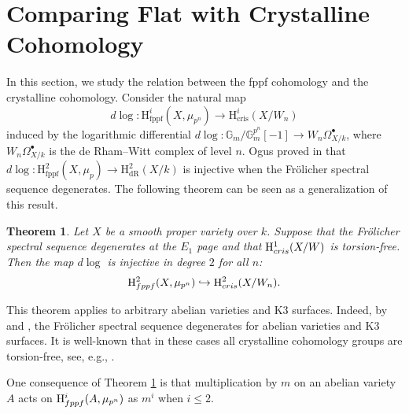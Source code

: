 \documentclass[a4paper,12pt,twoside]{report}
\newtheorem{theorem}{Theorem}[section]
\newtheorem{proposition}[theorem]{Proposition}
\newcommand{\G}{\mathbb{G}}
\newcommand{\cris}{\mathrm{cris}}
\newcommand{\fppf}{\mathrm{fppf}}
\newcommand{\dR}{\mathrm{dR}}
\newcommand{\HH}{\mathrm{H}}
\begin{document}
\medskip


\section{Comparing Flat with Crystalline Cohomology} \label{5}
In this section, we study the relation between the fppf cohomology and the crystalline cohomology. 
Consider the natural map 
\begin{equation}\label{dlog}
    d\log\colon \HH^i_{\fppf}(X,\mu_{p^n})\rightarrow \HH^i_{\cris}(X/W_n)
\end{equation}
induced by the logarithmic differential $d\log:\G_m/\G_m^{p^n}[-1]\rightarrow W_n\Omega_{X/k}^{\bullet}$, 
where $W_n\Omega_{X/k}^{\bullet}$ is the de Rham--Witt complex of level $n$. 
Ogus proved in \cite{Og} that $d\log\colon\HH^2_{\fppf}(X,\mu_p)\to \HH^2_{\dR}(X/k)$ is injective
when the Fr\"olicher spectral sequence degenerates. 
The following theorem can be seen as a generalization of this result.

\begin{theorem} \label{Inj}
    Let $X$ be a smooth proper variety over $k$.
    Suppose that the Fr\"olicher spectral sequence 
    degenerates at the $E_1$ page and that $\HH^1_{\rm{cris}}(X/W)$ is torsion-free. 
    Then the map $d\log$ is injective in degree $2$ for all $n$: 
    \begin{equation*}
        \HH^2_{\rm{fppf}}(X,\mu_{p^n})\hookrightarrow \HH^2_{\rm{cris}}(X/W_n).
    \end{equation*}
\end{theorem}

This theorem applies to arbitrary abelian varieties and K3 surfaces. Indeed,
by \cite[Proposition 5.1]{Od} and \cite[Proposition 2.2]{DI}, the Fr\"olicher spectral sequence degenerates for abelian varieties and K3 surfaces. It is well-known that
in these cases all crystalline cohomology groups are torsion-free, see, e.g., \cite[Exercise 1.8]{Li}.


One consequence of Theorem \ref{Inj} is that multiplication by $m$ on an abelian variety $A$ acts on 
$\HH^i_{\rm{fppf}}(A,\mu_{p^n})$ as $m^i$ when $i\leqslant 2$. 
\end{document}
